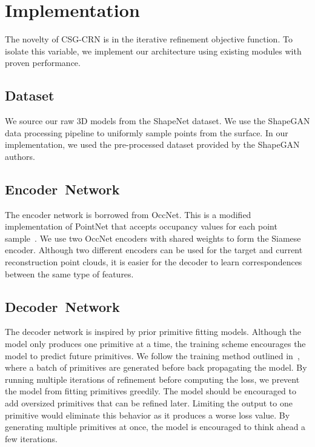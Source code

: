 
\chapter{Implementation}
\label{chap:implementation}

The novelty of CSG-CRN is in the iterative refinement objective function. To isolate this variable, we implement our architecture using existing modules with proven performance.


\section{Dataset}
\label{sec:dataset}

We source our raw 3D models from the ShapeNet dataset. We use the ShapeGAN data processing pipeline to uniformly sample points from the surface. In our implementation, we used the pre-processed dataset provided by the ShapeGAN authors.


\section{Encoder~Network}
\label{sec:encoder_network}

The encoder network is borrowed from OccNet. This is a modified implementation of PointNet that accepts occupancy values for each point sample~\cite{Mescheder2019}. We use two OccNet encoders with shared weights to form the Siamese encoder. Although two different encoders can be used for the target and current reconstruction point clouds, it is easier for the decoder to learn correspondences between the same type of features.


\section{Decoder~Network}
\label{sec:decoder_network}

The decoder network is inspired by prior primitive fitting models. Although the model only produces one primitive at a time, the training scheme encourages the model to predict future primitives. We follow the training method outlined in~\cite{Kleineberg2020}, where a batch of primitives are generated before back propagating the model. By running multiple iterations of refinement before computing the loss, we prevent the model from fitting primitives greedily. The model should be encouraged to add oversized primitives that can be refined later. Limiting the output to one primitive would eliminate this behavior as it produces a worse loss value. By generating multiple primitives at once, the model is encouraged to think ahead a few iterations.


